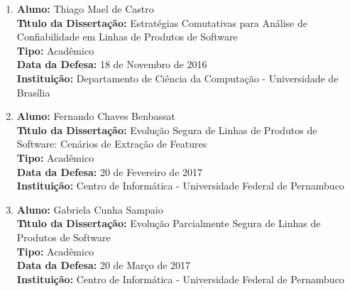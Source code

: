\documentclass[a4paper,oneside,10pt]{article}
\begin{document}
\begin{enumerate}
\renewcommand{\labelenumi}{{\large\bfseries\arabic{enumi}.}}

\item       \textbf{Aluno:} Thiago Mael de Castro \mbox{}\\
            \textbf{T\'{\i}tulo da Disserta\c{c}\~{a}o:} Estratégias Comutativas para Análise de Confiabilidade em Linhas de Produtos de Software\\
            \textbf{Tipo:} Acadêmico \\%
            \textbf{Data da Defesa:} 18 de Novembro de 2016 \\
            \textbf{Institui\c{c}\~{a}o:} Departamento de Ciência da Computação - Universidade de Brasília

\item       \textbf{Aluno:} Fernando Chaves Benbassat \mbox{} \\
           \textbf{T\'{\i}tulo da Disserta\c{c}\~{a}o:} Evolu\c{c}\~{a}o Segura de Linhas de Produtos de Software: Cen\'{a}rios de Extra\c{c}\~{a}o de Features\\
           \textbf{Tipo:} Acadêmico \\%
           \textbf{Data da Defesa:} 20 de Fevereiro de 2017 \\
           \textbf{Institui\c{c}\~{a}o:} Centro de Informática - Universidade Federal de Pernambuco
           
\item      \textbf{Aluno:} Gabriela Cunha Sampaio \mbox{} \\
           \textbf{T\'{\i}tulo da Disserta\c{c}\~{a}o:} Evolu\c{c}\~{a}o Parcialmente Segura de Linhas de Produtos de Software\\
           \textbf{Tipo:} Acadêmico \\%
           \textbf{Data da Defesa:} 20 de Mar\c{c}o de 2017 \\
           \textbf{Institui\c{c}\~{a}o:} Centro de Informática - Universidade Federal de Pernambuco

\end{enumerate}

\end{document}
